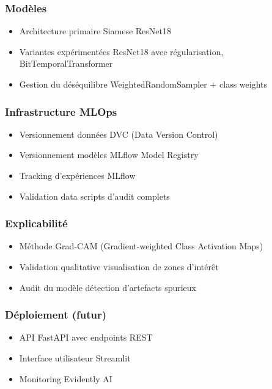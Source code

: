 \documentclass[12pt,a4paper]{article}
\begin{document}
\subsubsection{Modèles}
\begin{itemize}
    \item Architecture primaire\: Siamese ResNet18
    \item Variantes expérimentées\: ResNet18 avec régularisation, BitTemporalTransformer
    \item Gestion du déséquilibre\: WeightedRandomSampler + class weights
\end{itemize}

\subsubsection{Infrastructure MLOps}
\begin{itemize}
    \item Versionnement données\: DVC (Data Version Control)
    \item Versionnement modèles\: MLflow Model Registry
    \item Tracking d'expériences\: MLflow
    \item Validation data\: scripts d'audit complets
\end{itemize}

\subsubsection{Explicabilité}
\begin{itemize}
    \item Méthode\: Grad-CAM (Gradient-weighted Class Activation Maps)
    \item Validation qualitative\: visualisation de zones d'intérêt
    \item Audit du modèle\: détection d'artefacts spurieux
\end{itemize}

\subsubsection{Déploiement (futur)}
\begin{itemize}
    \item API\: FastAPI avec endpoints REST
    \item Interface utilisateur\: Streamlit
    \item Monitoring\: Evidently AI
\end{itemize}
\end{document}
